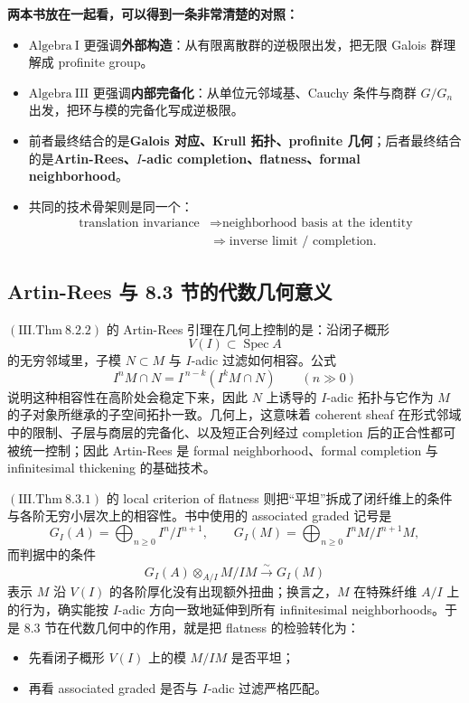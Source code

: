 \documentclass[a4paper]{ctexart}
\theoremstyle{definition}
\theoremstyle{analysis}
\theoremstyle{plain}
\begin{document}
\label{rem:topological-groups-comparison}
\textbf{两本书放在一起看，可以得到一条非常清楚的对照：}
\begin{itemize}
  \item \(\mathrm{Algebra\ I}\) 更强调\textbf{外部构造}：从有限离散群的逆极限出发，把无限 Galois 群理解成 profinite group。
  \item \(\mathrm{Algebra\ III}\) 更强调\textbf{内部完备化}：从单位元邻域基、Cauchy 条件与商群 \(G/G_n\) 出发，把环与模的完备化写成逆极限。
  \item 前者最终结合的是\textbf{Galois 对应、Krull 拓扑、profinite 几何}；后者最终结合的是\textbf{Artin-Rees、\(I\)-adic completion、flatness、formal neighborhood}。
  \item 共同的技术骨架则是同一个：
\[
    \begin{aligned}
      \text{translation invariance}
      &\Longrightarrow
      \text{neighborhood basis at the identity} \\
      &\Longrightarrow
      \text{inverse limit / completion}.
    \end{aligned}
  \]
\end{itemize}

\subsection{\texorpdfstring{Artin-Rees 与 8.3 节的代数几何意义}{Artin-Rees 与 8.3 节的代数几何意义}}\label{subsec:topic-artin-rees-geometry}

\label{rem:artin-rees-geometry}
\((\mathrm{III.Thm}\ 8.2.2)\) 的 Artin-Rees 引理在几何上控制的是：沿闭子概形
\[
  V(I)\subset \operatorname{Spec}A
\]
的无穷邻域里，子模 \(N\subset M\) 与 \(I\)-adic 过滤如何相容。公式
\[
  I^nM\cap N = I^{\,n-k}(I^kM\cap N)\qquad (n\gg 0)
\]
说明这种相容性在高阶处会稳定下来，因此 \(N\) 上诱导的 \(I\)-adic 拓扑与它作为 \(M\) 的子对象所继承的子空间拓扑一致。几何上，这意味着 coherent sheaf 在形式邻域中的限制、子层与商层的完备化、以及短正合列经过 completion 后的正合性都可被统一控制；因此 Artin-Rees 是 formal neighborhood、formal completion 与 infinitesimal thickening 的基础技术。

\medskip

\label{rem:local-flatness-geometry}
\((\mathrm{III.Thm}\ 8.3.1)\) 的 local criterion of flatness 则把“平坦”拆成了闭纤维上的条件与各阶无穷小层次上的相容性。书中使用的 associated graded 记号是
\[
  G_I(A)=\bigoplus_{n\ge 0} I^n/I^{n+1},
  \qquad
  G_I(M)=\bigoplus_{n\ge 0} I^nM/I^{n+1}M,
\]
而判据中的条件
\[
  G_I(A)\otimes_{A/I} M/IM \xrightarrow{\sim} G_I(M)
\]
表示 \(M\) 沿 \(V(I)\) 的各阶厚化没有出现额外扭曲；换言之，\(M\) 在特殊纤维 \(A/I\) 上的行为，确实能按 \(I\)-adic 方向一致地延伸到所有 infinitesimal neighborhoods。于是 8.3 节在代数几何中的作用，就是把 flatness 的检验转化为：
\begin{itemize}
  \item 先看闭子概形 \(V(I)\) 上的模 \(M/IM\) 是否平坦；
  \item 再看 associated graded 是否与 \(I\)-adic 过滤严格匹配。
\end{itemize}
\end{document}
